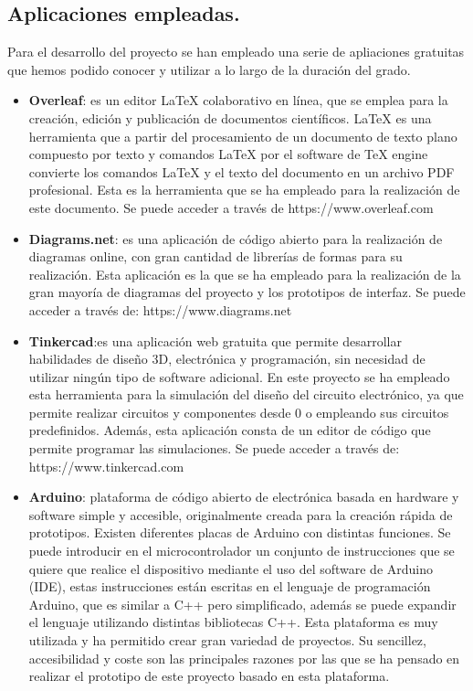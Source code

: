 \subsection{Aplicaciones empleadas.}
Para el desarrollo del proyecto se han empleado una serie de apliaciones gratuitas que hemos podido conocer y utilizar a lo largo de la duración del grado. 
\begin{itemize}
\item \textbf{Overleaf}\cite{Overleaf}: es un editor LaTeX colaborativo en línea, que se emplea para la creación, edición y publicación de documentos científicos. LaTeX es una herramienta que a partir del procesamiento de un documento de texto plano compuesto por texto y comandos LaTeX por el software de TeX engine convierte los comandos LaTeX y el texto del documento en un archivo PDF profesional. Esta es la herramienta que se ha empleado para la realización de este documento. Se puede acceder a través de https://www.overleaf.com  %

\item \textbf{Diagrams.net}\cite{Diagrams.net}: es una aplicación de código abierto para la realización de diagramas online, con gran cantidad de librerías de formas para su realización. Esta aplicación es la que se ha empleado para la realización de la gran mayoría de diagramas del proyecto y los prototipos de interfaz. Se puede acceder a través de: https://www.diagrams.net %

\item \textbf{Tinkercad}\cite{Tinkercad}:es una aplicación web gratuita que permite desarrollar habilidades de diseño 3D, electrónica y programación, sin necesidad de utilizar ningún tipo de software adicional. En este proyecto se ha empleado esta herramienta para la simulación del diseño del circuito electrónico, ya que permite realizar circuitos y componentes desde 0 o empleando sus circuitos predefinidos. Además, esta aplicación consta de un editor de código que permite programar las simulaciones. Se puede acceder a través de: https://www.tinkercad.com %

\item \textbf{Arduino}\cite{Arduino1, Arduino2}: plataforma de código abierto de electrónica basada en hardware y software simple y accesible, originalmente creada para la creación rápida de prototipos. Existen diferentes placas de Arduino con distintas funciones. Se puede introducir en el microcontrolador un conjunto de instrucciones que se quiere que realice el dispositivo mediante el uso del software de Arduino (IDE), estas instrucciones están escritas en el lenguaje de programación Arduino, que es similar a C++ pero simplificado, además se puede expandir el lenguaje utilizando distintas bibliotecas C++. Esta plataforma es muy utilizada y ha permitido crear gran variedad de proyectos. Su sencillez, accesibilidad y coste son las principales razones por las que se ha pensado en realizar el prototipo de este proyecto basado en esta plataforma. 


\end{itemize}

